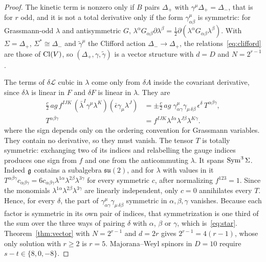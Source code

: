 \begin{proof}
The kinetic term is nonzero only if $B$ pairs $\Delta_+$ with $\gamma^\mu\Delta_+=\Delta_-$, that is for $r$ odd, and it is not a total derivative only if the form $\gamma^\mu_{\alpha\beta}$ is symmetric: for Grassmann-odd $\lambda$ and antisymmetric $G$, $\lambda^\alpha G_{\alpha\beta}\partial\lambda^\beta=\frac12\partial(\lambda^\alpha G_{\alpha\beta}\lambda^\beta)$. With $\Sigma=\Delta_+$, $\Sigma^*\cong\Delta_-$ and $\tilde\gamma^\mu$ the Clifford action $\Delta_-\to\Delta_+$, the relations~\eqref{eq:clifford} are those of $\operatorname{Cl}(V)$, so $(\Delta_+,\gamma,\tilde\gamma)$ is a vector structure with $d=D$ and $N=2^{r-1}$.

The terms of $\delta\mathcal L$ cubic in $\lambda$ come only from $\delta A$ inside the covariant derivative, since $\delta\lambda$ is linear in $F$ and $\delta F$ is linear in $\lambda$. They are
\begin{equation}
\label{eq:cubic}
\begin{aligned}\tfrac{c}{2}\,ag\,f^{IJK}\,(\bar\lambda^I\gamma^\mu\lambda^K)(\bar\epsilon\gamma_\mu\lambda^J)&=\pm\tfrac{c}{2}\,ag\;\gamma^\mu_{\alpha\gamma}\gamma_{\mu\,\delta\beta}\,\epsilon^\delta\,T^{\alpha\beta\gamma},\\ T^{\alpha\beta\gamma}&=f^{IJK}\lambda^{I\alpha}\lambda^{J\beta}\lambda^{K\gamma}.\end{aligned}
\end{equation}
where the sign depends only on the ordering convention for Grassmann variables. They contain no derivative, so they must vanish. The tensor $T$ is totally symmetric: exchanging two of its indices and relabelling the gauge indices produces one sign from $f$ and one from the anticommuting $\lambda$. It spans $\operatorname{Sym}^3\Sigma$. Indeed $\mathfrak{g}$ contains a subalgebra $\mathfrak{su}(2)$, and for $\lambda$ with values in it $T^{\alpha\beta\gamma}c_{\alpha\beta\gamma}=6c_{\alpha\beta\gamma}\lambda^{1\alpha}\lambda^{2\beta}\lambda^{3\gamma}$ for every symmetric $c$, after normalizing $f^{123}=1$. Since the monomials $\lambda^{1\alpha}\lambda^{2\beta}\lambda^{3\gamma}$ are linearly independent, only $c=0$ annihilates every $T$. Hence, for every $\delta$, the part of $\gamma^\mu_{\alpha\gamma}\gamma_{\mu\,\delta\beta}$ symmetric in $\alpha,\beta,\gamma$ vanishes. Because each factor is symmetric in its own pair of indices, that symmetrization is one third of the sum over the three ways of pairing $\delta$ with $\alpha$, $\beta$ or $\gamma$, which is~\eqref{eq:star}. Theorem~\ref{thm:vector} with $N=2^{r-1}$ and $d=2r$ gives $2^{r-1}=4(r-1)$, whose only solution with $r\ge2$ is $r=5$. Majorana--Weyl spinors in $D=10$ require $s-t\in\{8,0,-8\}$.
\end{proof}

